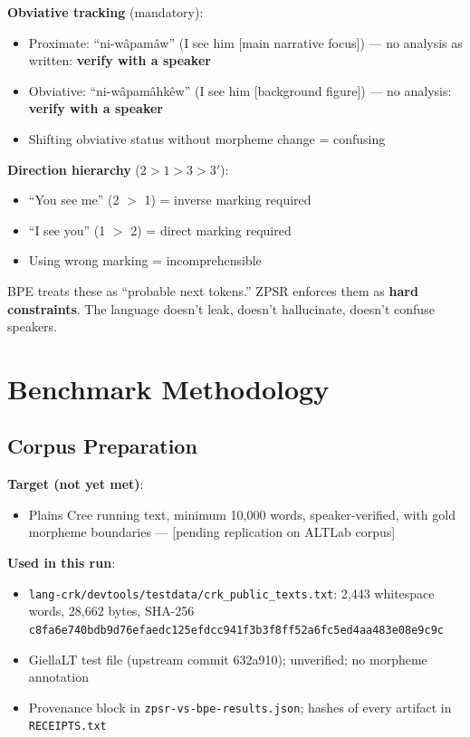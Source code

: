 \documentclass[11pt,oneside]{article}
\begin{document}
\textbf{Obviative tracking} (mandatory):
\begin{itemize}
  \item Proximate: ``ni-wâpamâw'' (I see him [main narrative focus]) --- no analysis as written: \textbf{verify with a speaker}
  \item Obviative: ``ni-wâpamâhkêw'' (I see him [background figure]) --- no analysis: \textbf{verify with a speaker}
  \item Shifting obviative status without morpheme change = confusing
\end{itemize}

\textbf{Direction hierarchy} ($2 > 1 > 3 > 3'$):
\begin{itemize}
  \item ``You see me'' (2 $>$ 1) = inverse marking required
  \item ``I see you'' (1 $>$ 2) = direct marking required
  \item Using wrong marking = incomprehensible
\end{itemize}

BPE treats these as ``probable next tokens.'' ZPSR enforces them as \textbf{hard constraints}. The language doesn't leak, doesn't hallucinate, doesn't confuse speakers.

\section{Benchmark Methodology}

\subsection{Corpus Preparation}

\textbf{Target (not yet met)}:
\begin{itemize}
  \item Plains Cree running text, minimum 10,000 words, speaker-verified, with gold morpheme boundaries --- [pending replication on ALTLab corpus]
\end{itemize}

\textbf{Used in this run}:
\begin{itemize}
  \item \texttt{lang-crk/devtools/testdata/crk\_public\_texts.txt}: 2,443 whitespace words, 28,662 bytes, SHA-256 \texttt{c8fa6e740bdb9d76efaedc125efdcc941f3b3f8ff52a6fc5ed4aa483e08e9c9c}
  \item GiellaLT test file (upstream commit 632a910); unverified; no morpheme annotation
  \item Provenance block in \texttt{zpsr-vs-bpe-results.json}; hashes of every artifact in \texttt{RECEIPTS.txt}
\end{itemize}
\end{document}
